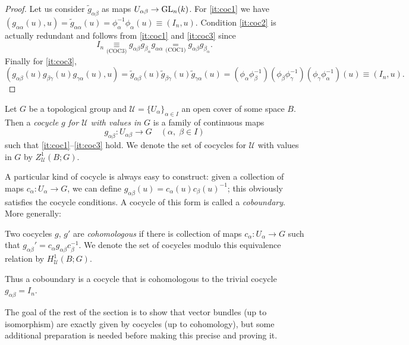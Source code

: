 \documentclass[a4paper,openany]{scrbook}
\begin{document}
\begin{proof}
  Let us consider $\tilde g_{\alpha\beta}$ as maps $U_{\alpha\beta} \to \operatorname{GL}_n(k)$. For \ref{it:coc1} we have $(g_{\alpha\alpha}(u),u) = \tilde g_{\alpha\alpha}(u) =  \phi_\alpha^{-1} \phi_\alpha(u) \equiv (I_n,u)$.
Condition \ref{it:coc2} is actually redundant and follows from \ref{it:coc1} and \ref{it:coc3} since
\[
I_n \underset{\text{(COC3)}}\equiv g_{\alpha\beta} g_{\beta_\alpha} g_{\alpha\alpha} \underset{\text{(COC1)}} = g_{\alpha\beta} g_{\beta_\alpha}.
\]
 Finally for \ref{it:coc3},
\[
  (g_{\alpha\beta}(u) g_{\beta \gamma}(u) g_{\gamma\alpha}(u),u) = \tilde g_{\alpha\beta}(u) \tilde g_{\beta \gamma}(u) \tilde g_{\gamma\alpha}(u) = (\phi_\alpha \phi_\beta^{-1})(\phi_\beta\phi_\gamma^{-1})(\phi_\gamma\phi_\alpha^{-1})(u) \equiv (I_n,u).
\]
\end{proof}


\begin{defn}
Let $G$ be a topological group and $\mathcal U = \{U_\alpha\}_{\alpha \in I}$ an open cover of some space $B$. Then a \emph{cocycle $g$ for $\mathcal U$ with values in $G$} is a family of continuous maps
\[
g_{\alpha\beta}\colon U_{\alpha\beta} \to G \quad (\alpha,\;\beta \in I)
\]
such that \ref{it:coc1}--\ref{it:coc3} hold. We denote the set of cocycles for $\mathcal U$ with values in $G$ by $Z^1_{\mathcal U}(B;G)$.
\end{defn}


A particular kind of cocycle is always easy to construct: given a collection of maps $c_\alpha\colon U_\alpha \to G$, we can define $g_{\alpha\beta}(u) = c_\alpha(u)c_\beta(u)^{-1}$; this obviously satisfies the cocycle conditions. A cocycle of this form is called a \emph{coboundary}. More generally:

\begin{defn} Two cocycles $g$, $g'$ are \emph{cohomologous} if there is collection of maps $c_\alpha\colon U_{\alpha} \to G$ such that $g_{\alpha\beta}' = c_\alpha g_{\alpha\beta} c_\beta^{-1}$. We denote the set of cocycles modulo this equivalence relation by $H^1_{\mathcal U}(B;G)$.
\end{defn}

Thus a coboundary is a cocycle that is cohomologous to the trivial cocycle $g_{\alpha\beta}=I_n$.

The goal of the rest of the section is to show that vector bundles (up to isomorphism) are exactly given by cocycles (up to cohomology), but some additional preparation is needed before making this precise and proving it.
\end{document}
